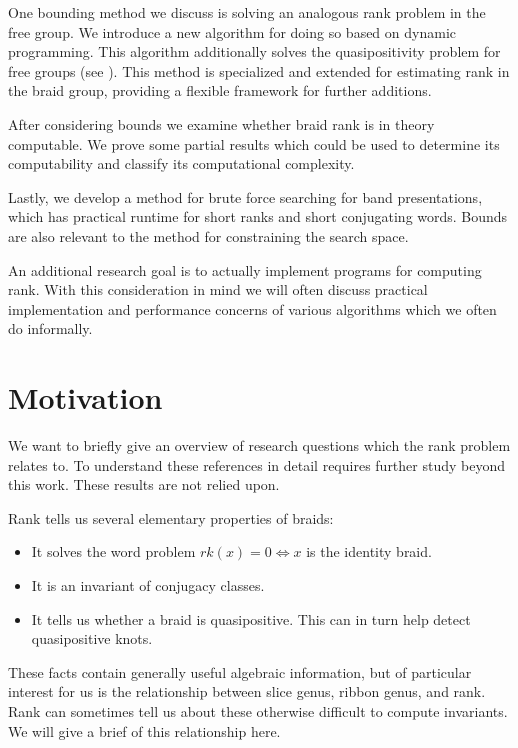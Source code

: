 \documentclass[12pt]{thesis}
\begin{document}
One bounding method we discuss is solving an analogous rank problem in the free group.
We introduce a new algorithm for doing so based on dynamic programming.
This algorithm additionally solves the quasipositivity problem for free groups (see \cite{quasipositive-3-braids}).
This method is specialized and extended for estimating rank in the braid group, providing a flexible framework
for further additions.

After considering bounds we examine whether braid rank is in theory computable.
We prove some partial results which could be used to determine its computability
and classify its computational complexity.

Lastly, we develop a method for brute force searching for band presentations,
which has practical runtime for short ranks and short conjugating words.
Bounds are also relevant to the method for constraining the search space.

An additional research goal is to actually implement programs for computing rank.
With this consideration in mind 
we will often discuss practical implementation 
and performance concerns of various algorithms
which we often do informally.

\section{Motivation}

\label{sec:motivation}

We want to briefly give an overview of research
questions which the rank problem relates to.
To understand these references in detail requires further study
beyond this work. These results are not relied upon.

Rank tells us several elementary properties of braids:
\begin{itemize}
    \item It solves the word problem $rk(x) = 0 \Leftrightarrow x$ is the identity braid.
    \item It is an invariant of conjugacy classes.
    \item It tells us whether a braid is quasipositive.
          This can in turn help detect quasipositive knots.
\end{itemize}

These facts contain generally useful algebraic information, but of particular
interest for us is the relationship between slice genus, ribbon genus, and rank.
Rank can sometimes tell us about these otherwise difficult to compute invariants.
We will give a brief of this relationship here.
\end{document}
